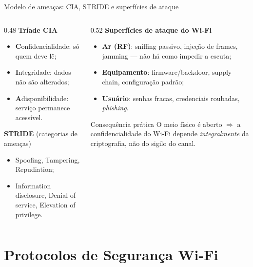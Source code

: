 \documentclass[aspectratio=169,11pt]{beamer}
\begin{document}
\begin{frame}{Modelo de ameaças: CIA, STRIDE e superfícies de ataque}
  \begin{columns}
    \begin{column}{0.48\textwidth}
      \textbf{Tríade CIA}
      \begin{itemize}
        \item \textbf{C}onfidencialidade: só quem deve lê;
        \item \textbf{I}ntegridade: dados não são alterados;
        \item \textbf{A}disponibilidade: serviço permanece acessível.
      \end{itemize}
      \textbf{STRIDE} (categorias de ameaças)
      \begin{itemize}
        \item Spoofing, Tampering, Repudiation;
        \item Information disclosure, Denial of service, Elevation of privilege.
      \end{itemize}
    \end{column}
    \begin{column}{0.52\textwidth}
      \textbf{Superfícies de ataque do Wi-Fi}
      \begin{itemize}
        \item \textbf{Ar (RF)}: sniffing passivo, injeção de frames, jamming --- não há como impedir a escuta;
        \item \textbf{Equipamento}: firmware/backdoor, supply chain, configuração padrão;
        \item \textbf{Usuário}: senhas fracas, credenciais roubadas, \emph{phishing}.
      \end{itemize}
      \begin{alertblock}{Consequência prática}
        O meio físico é aberto $\Rightarrow$ a confidencialidade do Wi-Fi depende \emph{integralmente} da criptografia, não do sigilo do canal.
      \end{alertblock}
    \end{column}
  \end{columns}
\end{frame}

\section{Protocolos de Segurança Wi-Fi}
\end{document}
